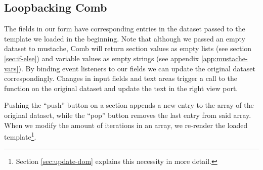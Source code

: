 \documentclass[thesis.tex]{subfiles}
\begin{document}
\subsection{Loopbacking Comb}
\label{sec:loopbacking}
The fields in our form have corresponding entries in the dataset passed to
the template we loaded in the beginning.
Note that although we passed an empty dataset to mustache, Comb will return
section values as empty lists (see section \ref{sec:if-else}) and
variable values as empty strings (see appendix \ref{app:mustache-vars}).
By binding event listeners to our fields we can update the original dataset
correspondingly. Changes in input fields and text areas trigger a call to the
 function on the original dataset and update the text in the
right view port.

Pushing the ``push'' button on a section appends a new entry to the array of the
original dataset, while the ``pop'' button removes the last entry from said array.
When we modify the amount of iterations in an array, we re-render the loaded
template\footnote{Section \ref{sec:update-dom} explains this necessity
in more detail.}.
\end{document}
